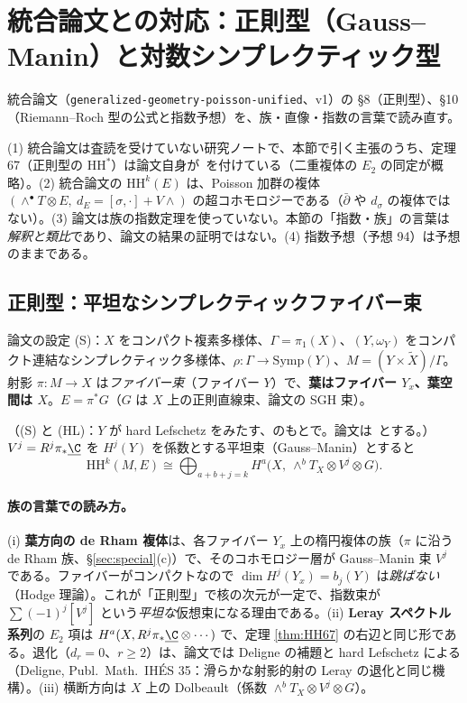 
\section{統合論文との対応：正則型（Gauss--Manin）と対数シンプレクティック型}\label{sec:unified}
統合論文（\texttt{generalized-geometry-poisson-unified}、v1）の \S8（正則型）、\S10（Riemann--Roch 型の公式と指数予想）を、族・直像・指数の言葉で読み直す。
\begin{rem}[この節の注意]\label{rem:caution}
(1) 統合論文は査読を受けていない研究ノートで、本節で引く主張のうち、定理 67（正則型の $\mathrm{HH}^*$）は論文自身が\tQ\ を付けている（二重複体の $E_2$ の同定が概略）。(2) 統合論文の $\mathrm{HH}^k(E)$ は、Poisson 加群の複体 $(\wedge^\bullet T\otimes E,\ d_E=[\sigma,\cdot]+V\wedge)$ の超コホモロジーである（$\bar\partial$ や $d_\sigma$ の複体ではない）。(3) 論文は族の指数定理を使っていない。本節の「指数・族」の言葉は\emph{解釈と類比}であり、論文の結果の証明ではない。(4) 指数予想（予想 94）は予想のままである。
\end{rem}

\subsection{正則型：平坦なシンプレクティックファイバー束}
論文の設定 (S)：$X$ をコンパクト複素多様体、$\Gamma=\pi_1(X)$、$(Y,\omega_Y)$ をコンパクト連結なシンプレクティック多様体、$\rho:\Gamma\to\mathrm{Symp}(Y)$、$M=(Y\times\widetilde X)/\Gamma$。射影 $\pi:M\to X$ は\emph{ファイバー束}（ファイバー $Y$）で、\textbf{葉はファイバー $Y_x$、葉空間は $X$}。$E=\pi^*G$（$G$ は $X$ 上の正則直線束、論文の SGH 束）。
\begin{thm}[論文の定理 67（要約）]\label{thm:HH67}
（(S) と (HL)：$Y$ が hard Lefschetz をみたす、のもとで。論文は\tQ\ とする。）$V^j=R^j\pi_*\underline\C$ を $H^j(Y)$ を係数とする平坦束（Gauss--Manin）とすると
\[
\mathrm{HH}^k(M,E)\cong\bigoplus_{a+b+j=k}H^a\bigl(X,\ \wedge^bT_X\otimes V^j\otimes G\bigr).
\]
\end{thm}
\paragraph{族の言葉での読み方。}(i) \textbf{葉方向の de Rham 複体}は、各ファイバー $Y_x$ 上の楕円複体の族（$\pi$ に沿う de Rham 族、\S\ref{sec:special}(c)）で、そのコホモロジー層が Gauss--Manin 束 $V^j$ である。ファイバーがコンパクトなので $\dim H^j(Y_x)=b_j(Y)$ は\emph{跳ばない}（Hodge 理論）。これが「正則型」で核の次元が一定で、指数束が $\sum(-1)^j[V^j]$ という\emph{平坦な}仮想束になる理由である。(ii) \textbf{Leray スペクトル系列}の $E_2$ 項は $H^a(X,R^j\pi_*\underline\C\otimes\cdots)$ で、定理 \ref{thm:HH67} の右辺と同じ形である。退化（$d_r=0$、$r\ge2$）は、論文では Deligne の補題と hard Lefschetz による（Deligne, Publ.\ Math.\ IH\'ES 35：滑らかな射影的射の Leray の退化と同じ機構）。(iii) 横断方向は $X$ 上の Dolbeault（係数 $\wedge^bT_X\otimes V^j\otimes G$）。


